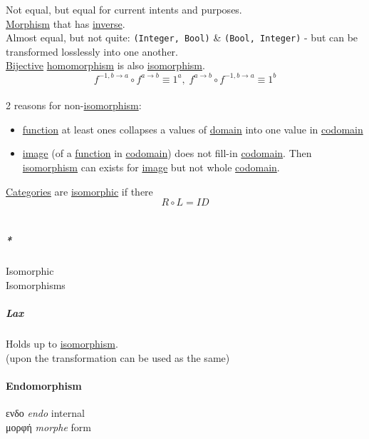 \documentclass[11pt]{article}
\begin{document}
Not equal, but equal for current intents and purposes.\\
\hyperref[orgad99fc6]{Morphism} that has \hyperref[org41275e7]{inverse}.\\
Almost equal, but not quite: \texttt{(Integer, Bool)} \& \texttt{(Bool, Integer)} - but can be transformed losslessly into one another.\\

\hyperref[orge215793]{Bijective} \hyperref[org01da5b8]{homomorphism} is also \hyperref[org3db0474]{isomorphism}.\\

$$ f^{-1, b \to a} \circ f^{a \to b} \equiv 1^a, \; f^{a \to b} \circ f^{-1, b \to a} \equiv 1^b $$\\

2 reasons for non-\hyperref[org3db0474]{isomorphism}:\\
\begin{itemize}
\item \hyperref[orgeb5cddb]{function} at least ones collapses a values of \hyperref[orgf784585]{domain} into one value in \hyperref[orgee70232]{codomain}\\
\item \hyperref[orgeb43f0e]{image} (of a \hyperref[orgeb5cddb]{function} in \hyperref[orgee70232]{codomain}) does not fill-in \hyperref[orgee70232]{codomain}. Then \hyperref[org3db0474]{isomorphism} can exists for \hyperref[orgeb43f0e]{image} but not whole \hyperref[orgee70232]{codomain}.\\
\end{itemize}

\hyperref[org43ea200]{Categories} are \hyperref[org6d62cf4]{isomorphic} if there $$ R \circ L = ID $$\\

\subparagraph{\emph{*}}
\label{sec:org5cc910f}

\label{org6d62cf4}Isomorphic\\
\label{org09c4912}Isomorphisms\\

\subparagraph{\label{org678d1cb}Lax}
\label{sec:org2437d20}
Holds up to \hyperref[org3db0474]{isomorphism}.\\
(upon the transformation can be used as the same)\\

\paragraph{\label{org67037d9}Endomorphism}
\label{sec:org5f0a48a}
ενδο \emph{endo} internal\\
μορφή \emph{morphe} form\\
\end{document}
